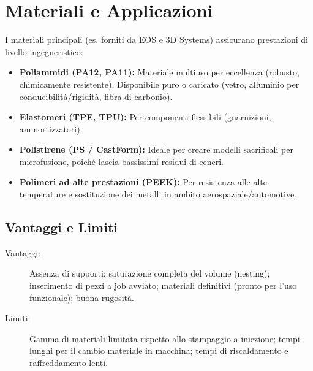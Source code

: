 %
\section{Materiali e Applicazioni}
I materiali principali (es. forniti da EOS e 3D Systems) assicurano prestazioni di livello ingegneristico:
\begin{itemize}
    \item \textbf{Poliammidi (PA12, PA11):} Materiale multiuso per eccellenza (robusto, chimicamente resistente). Disponibile puro o caricato (vetro, alluminio per conducibilità/rigidità, fibra di carbonio).
    \item \textbf{Elastomeri (TPE, TPU):} Per componenti flessibili (guarnizioni, ammortizzatori).
    \item \textbf{Polistirene (PS / CastForm):} Ideale per creare modelli sacrificali per microfusione, poiché lascia bassissimi residui di ceneri.
    \item \textbf{Polimeri ad alte prestazioni (PEEK):} Per resistenza alle alte temperature e sostituzione dei metalli in ambito aerospaziale/automotive.
\end{itemize}

\subsection{Vantaggi e Limiti}
\begin{description}
    \item[Vantaggi:] Assenza di supporti; saturazione completa del volume (nesting); inserimento di pezzi a job avviato; materiali definitivi (pronto per l'uso funzionale); buona rugosità.
    \item[Limiti:] Gamma di materiali limitata rispetto allo stampaggio a iniezione; tempi lunghi per il cambio materiale in macchina; tempi di riscaldamento e raffreddamento lenti.
\end{description}